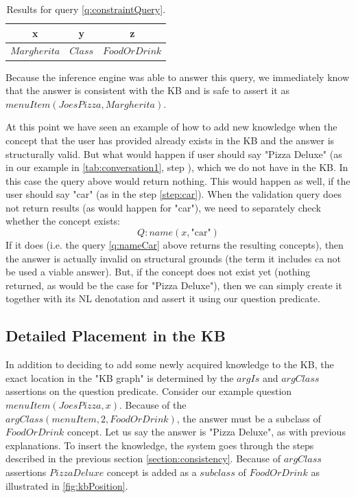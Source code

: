 \begin{table}[H]
\centering
\caption{Results for query \ref{q:constraintQuery}.}
\label{tab:constraintResults}
\begin{tabular}{|c|c|c|}
	\hline
	\textbf{x} & \textbf{y} & \textbf{z} \\
    \hline
    $Margherita$ & $Class$ & $FoodOrDrink$ \\
    \hline
\end{tabular}
\end{table}
Because the inference engine was able to answer this query, we immediately
know that the answer is consistent with the KB and is safe to assert it as 
$menuItem(JoesPizza,Margherita)$. 

At this point we have seen an example of how to add new knowledge when the
concept that the user has provided already exists in the KB and the answer is 
structurally valid. But what would happen if user should say "Pizza Deluxe" 
(as in our example in \autoref{tab:conversation1}, step 
), which we do not have in the KB. In this case the query
above would return nothing. This would happen as well, if the user should say 
"car" (as in the step \ref{step:car}). When the validation query does not return
results (as would happen for "car"), we need to separately check whether the 
concept exists:
\begin{equation}\label{q:nameCar}
Q:name(x,\text{"car"})
\end{equation}
If it does (i.e. the query \ref{q:nameCar} above returns the resulting 
concepts), then the answer is actually invalid on structural grounds (the term 
it includes ca not be used a viable answer).
But, if the concept does not exist yet (nothing returned, as would be the case 
for "Pizza Deluxe"), then we can simply create it together with its NL 
denotation and assert it using our question predicate.

\subsection{Detailed Placement in the KB}
\label{section:placement}
In addition to deciding to add some newly acquired knowledge to the KB, the 
exact location in the "KB graph" is determined by the $argIs$ and $argClass$
assertions on the question predicate. Consider our example question
$menuItem(JoesPizza,x)$. Because of the $argClass(menuItem,2,FoodOrDrink)$, the
answer must be a subclass of $FoodOrDrink$ concept. Let us say the answer is
"Pizza Deluxe", as with previous explanations. To insert the knowledge, the 
system goes through the steps described in the previous section 
\ref{section:consistency}. Because of $argClass$ assertions $PizzaDeluxe$ 
concept is added as a $subclass$ of $FoodOrDrink$ as illustrated in 
\autoref{fig:kbPosition}.

